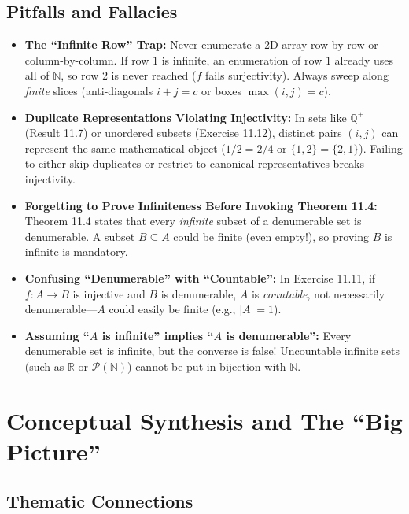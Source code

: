 \documentclass[11pt, letterpaper]{article}
\theoremstyle{definition}
\theoremstyle{remark}
\begin{document}
\subsection{Pitfalls and Fallacies}

\begin{itemize}
    \item \textbf{The ``Infinite Row'' Trap:} Never enumerate a 2D array row-by-row or column-by-column. If row $1$ is infinite, an enumeration of row $1$ already uses all of $\mathbb{N}$, so row $2$ is never reached ($f$ fails surjectivity). Always sweep along \textit{finite} slices (anti-diagonals $i + j = c$ or boxes $\max(i, j) = c$).
    \item \textbf{Duplicate Representations Violating Injectivity:} In sets like $\mathbb{Q}^+$ (Result 11.7) or unordered subsets (Exercise 11.12), distinct pairs $(i, j)$ can represent the same mathematical object ($1/2 = 2/4$ or $\{1, 2\} = \{2, 1\}$). Failing to either skip duplicates or restrict to canonical representatives breaks injectivity.
    \item \textbf{Forgetting to Prove Infiniteness Before Invoking Theorem 11.4:} Theorem 11.4 states that every \textit{infinite} subset of a denumerable set is denumerable. A subset $B \subseteq A$ could be finite (even empty!), so proving $B$ is infinite is mandatory.
    \item \textbf{Confusing ``Denumerable'' with ``Countable'':} In Exercise 11.11, if $f : A \to B$ is injective and $B$ is denumerable, $A$ is \textit{countable}, not necessarily denumerable---$A$ could easily be finite (e.g., $|A| = 1$).
    \item \textbf{Assuming ``$A$ is infinite'' implies ``$A$ is denumerable'':} Every denumerable set is infinite, but the converse is false! Uncountable infinite sets (such as $\mathbb{R}$ or $\mathcal{P}(\mathbb{N})$) cannot be put in bijection with $\mathbb{N}$.
\end{itemize}

\section{Conceptual Synthesis and The ``Big Picture''}

\subsection{Thematic Connections}
\end{document}
